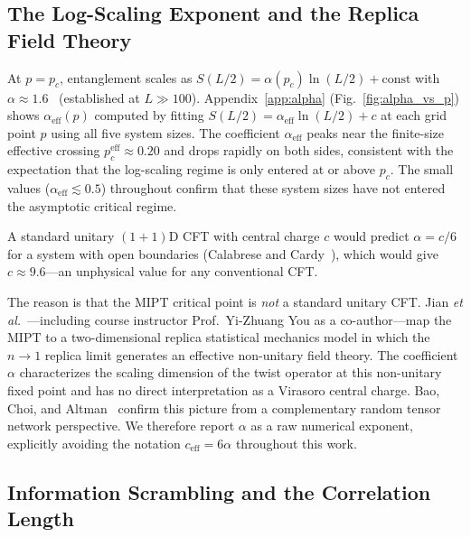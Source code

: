 \documentclass[twocolumn,prl,aps,floatfix]{revtex4-2}
\begin{document}
\subsection{The Log-Scaling Exponent and the Replica Field Theory}
\label{sec:cft}

At $p = p_c$, entanglement scales as $S(L/2) = \alpha(p_c)\ln(L/2) + \mathrm{const}$
with $\alpha \approx 1.6$~\cite{Li2019} (established at $L \gg 100$).
Appendix~\ref{app:alpha} (Fig.~\ref{fig:alpha_vs_p}) shows $\alpha_{\mathrm{eff}}(p)$
computed by fitting $S(L/2) = \alpha_{\mathrm{eff}}\ln(L/2) + c$ at each grid
point $p$ using all five system sizes.
The coefficient $\alpha_{\mathrm{eff}}$ peaks near the finite-size effective
crossing $p_c^{\mathrm{eff}} \approx 0.20$ and drops rapidly on both sides,
consistent with the expectation that the log-scaling regime is only entered
at or above $p_c$.
The small values ($\alpha_{\mathrm{eff}} \lesssim 0.5$) throughout confirm that
these system sizes have not entered the asymptotic critical regime.

A standard unitary $(1+1)$D CFT with central charge $c$ would predict
$\alpha = c/6$ for a system with open boundaries
(Calabrese and Cardy~\cite{CalabreseCardy2004}), which would give
$c \approx 9.6$---an unphysical value for any conventional CFT.

The reason is that the MIPT critical point is \textit{not} a standard unitary CFT.
Jian \textit{et al.}~\cite{Jian2020}---including course instructor
Prof.\ Yi-Zhuang You as a co-author---map the MIPT to a two-dimensional
replica statistical mechanics model in which the $n \to 1$ replica limit
generates an effective non-unitary field theory.
The coefficient $\alpha$ characterizes the scaling dimension of the twist
operator at this non-unitary fixed point and has no direct interpretation
as a Virasoro central charge.
Bao, Choi, and Altman~\cite{Bao2020} confirm this picture from a complementary
random tensor network perspective.
We therefore report $\alpha$ as a raw numerical exponent, explicitly avoiding
the notation $c_{\mathrm{eff}} = 6\alpha$ throughout this work.

\subsection{Information Scrambling and the Correlation Length}
\end{document}
